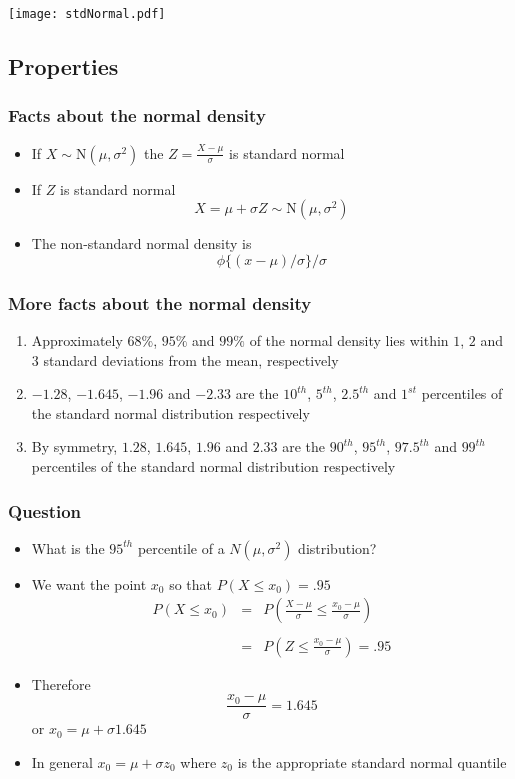 \documentclass[aspectratio=169]{beamer}
\begin{document}
\begin{frame}
\texttt{[image: stdNormal.pdf]}
\end{frame}

\subsection{Properties}
\begin{frame}\frametitle{Facts about the normal density}
\begin{itemize}
\item If $X \sim \mbox{N}(\mu,\sigma^2)$ the $Z = \frac{X -\mu}{\sigma}$ is standard normal
\item If $Z$ is standard normal $$X = \mu + \sigma Z \sim \mbox{N}(\mu, \sigma^2)$$
\item The non-standard normal density is $$\phi\{(x - \mu) / \sigma\}/\sigma$$
\end{itemize}
\end{frame}

\begin{frame}\frametitle{More facts about the normal density}
  \begin{enumerate}
  \item Approximately $68\%$, $95\%$ and $99\%$  of the normal density lies within
    $1$, $2$ and $3$ standard deviations from the mean, respectively
  \item $-1.28$, $-1.645$, $-1.96$ and $-2.33$ are the $10^{th}$, $5^{th}$, $2.5^{th}$ and $1^{st}$
    percentiles of the standard normal distribution respectively
  \item By symmetry, $1.28$, $1.645$, $1.96$ and $2.33$ are the $90^{th}$,
    $95^{th}$, $97.5^{th}$ and $99^{th}$ percentiles of the standard normal
    distribution respectively
  \end{enumerate}
\end{frame}

\begin{frame}\frametitle{Question}
\begin{itemize}
\item What is the $95^{th}$ percentile of a $N(\mu, \sigma^2)$ distribution?
\item We want the point $x_0$ so that $P(X \leq x_0) = .95$
  \begin{eqnarray*}
    P(X \leq x_0) & = & P\left(\frac{X - \mu}{\sigma} \leq \frac{x_0 - \mu}{\sigma}\right) \\ \\
                  & = & P\left(Z \leq \frac{x_0 - \mu}{\sigma}\right) =  .95
  \end{eqnarray*}
\item Therefore
  $$\frac{x_0 - \mu}{\sigma} = 1.645$$
  or $x_0 = \mu + \sigma 1.645$
\item In general $x_0 = \mu + \sigma z_0$ where $z_0$ is the appropriate standard normal quantile
\end{itemize}
\end{frame}
\end{document}
